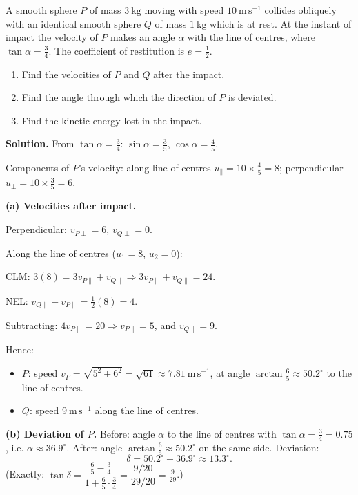 \documentclass[11pt]{article}
\begin{document}
\begin{exoresolu}
A smooth sphere $P$ of mass $3\ \mathrm{kg}$ moving with speed $10\ \mathrm{m\,s^{-1}}$ collides obliquely with an identical smooth sphere $Q$ of mass $1\ \mathrm{kg}$ which is at rest. At the instant of impact the velocity of $P$ makes an angle $\alpha$ with the line of centres, where $\tan\alpha = \tfrac{3}{4}$. The coefficient of restitution is $e = \tfrac{1}{2}$.
\begin{enumerate}
\item Find the velocities of $P$ and $Q$ after the impact.
\item Find the angle through which the direction of $P$ is deviated.
\item Find the kinetic energy lost in the impact.
\end{enumerate}
\tcblower
\textbf{Solution.} From $\tan\alpha = \tfrac{3}{4}$: $\sin\alpha = \tfrac{3}{5}$, $\cos\alpha = \tfrac{4}{5}$.

Components of $P$'s velocity: along line of centres $u_{\parallel} = 10\times\tfrac{4}{5} = 8$; perpendicular $u_{\perp} = 10\times\tfrac{3}{5} = 6$.

\textbf{(a) Velocities after impact.}

Perpendicular: $v_{P\perp} = 6$, $v_{Q\perp} = 0$.

Along the line of centres ($u_1 = 8$, $u_2 = 0$):

CLM: $3(8) = 3v_{P\parallel} + v_{Q\parallel} \Rightarrow 3v_{P\parallel} + v_{Q\parallel} = 24$.

NEL: $v_{Q\parallel} - v_{P\parallel} = \tfrac{1}{2}(8) = 4$.

Subtracting: $4v_{P\parallel} = 20 \Rightarrow v_{P\parallel} = 5$, and $v_{Q\parallel} = 9$.

Hence:
\begin{itemize}
\item $P$: speed $v_P = \sqrt{5^2 + 6^2} = \sqrt{61} \approx 7.81\ \mathrm{m\,s^{-1}}$, at angle $\arctan\tfrac{6}{5} \approx 50.2^{\circ}$ to the line of centres.
\item $Q$: speed $9\ \mathrm{m\,s^{-1}}$ along the line of centres.
\end{itemize}

\textbf{(b) Deviation of $P$.} Before: angle $\alpha$ to the line of centres with $\tan\alpha = \tfrac{3}{4} = 0.75$, i.e. $\alpha \approx 36.9^{\circ}$. After: angle $\arctan\tfrac{6}{5} \approx 50.2^{\circ}$ on the same side. Deviation:
\[ \delta = 50.2^{\circ} - 36.9^{\circ} \approx 13.3^{\circ}. \]
(Exactly: $\tan\delta = \dfrac{\tfrac{6}{5}-\tfrac{3}{4}}{1+\tfrac{6}{5}\cdot\tfrac{3}{4}} = \dfrac{9/20}{29/20} = \tfrac{9}{29}$.)


\end{exoresolu}
\end{document}
